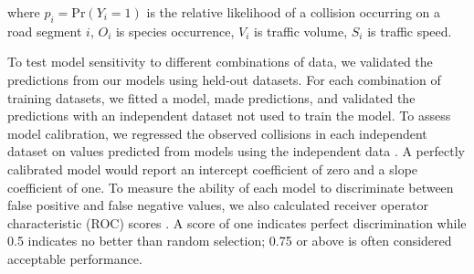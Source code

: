 \noindent where $p_i=\text{Pr}(Y_i=1)$ is the relative likelihood of a collision occurring on a road segment $i$, $O_i$ is species occurrence, $V_i$ is traffic volume, $S_i$ is traffic speed.

To test model sensitivity to different combinations of data, we validated the predictions from our models using held-out datasets. For each combination of training datasets, we fitted a model, made predictions, and validated the predictions with an independent dataset not used to train the model. To assess model calibration, we regressed the observed collisions in each independent dataset on values predicted from models using the independent data \citep[see][]{mill91}. A perfectly calibrated model would report an intercept coefficient of zero and a slope coefficient of one. To measure the ability of each model to discriminate between false positive and false negative values, we also calculated receiver operator characteristic (ROC) scores \citep[see][]{metz78}. A score of one indicates perfect discrimination while 0.5 indicates no better than random selection; 0.75 or above is often considered acceptable performance.

